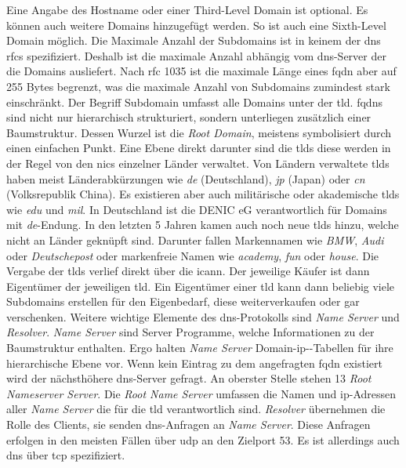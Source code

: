 \documentclass[titlepage]{report}
\begin{document}
Eine Angabe des Hostname oder einer Third-Level
Domain ist optional. Es können auch weitere Domains hinzugefügt werden.
So ist auch eine Sixth-Level Domain möglich. Die Maximale Anzahl der
Subdomains ist in keinem der \gls{dns} \glspl{rfc} spezifiziert. Deshalb
ist die maximale Anzahl abhängig vom \gls{dns}\hyp{}Server der die
Domains ausliefert. Nach \gls{rfc} 1035 ist die maximale Länge eines
\gls{fqdn} aber auf 255 Bytes begrenzt\cite[siehe Section
2.3.4]{RFC1035}, was die maximale Anzahl von Subdomains zumindest stark
einschränkt. Der Begriff Subdomain umfasst alle Domains unter der
\gls{tld}. \glspl{fqdn} sind nicht nur hierarchisch strukturiert, sondern
unterliegen zusätzlich einer Baumstruktur. Dessen Wurzel ist die
\emph{Root Domain}, meistens symbolisiert durch einen einfachen Punkt.
Eine Ebene direkt darunter sind die \glspl{tld} diese
werden in der Regel von den \glspl{nic} einzelner Länder verwaltet. Von
Ländern verwaltete \glspl{tld} haben meist Länderabkürzungen wie
\emph{de} (Deutschland), \emph{jp} (Japan) oder \emph{cn} (Volksrepublik
China). Es existieren aber auch militärische oder akademische
\glspl{tld} wie \emph{edu} und \emph{mil}. In Deutschland ist die DENIC eG
verantwortlich für Domains mit \emph{de}\hyp{}Endung.
In den letzten 5 Jahren kamen auch noch neue \glspl{tld} hinzu, welche
nicht an Länder geknüpft sind. Darunter fallen Markennamen wie
\emph{BMW}, \emph{Audi} oder \emph{Deutschepost} oder markenfreie Namen
wie \emph{academy}, \emph{fun} oder \emph{house}\cite{NEWTLDLIST}. Die
Vergabe der \glspl{tld} verlief direkt über die \gls{icann}. Der jeweilige
Käufer ist dann Eigentümer der jeweiligen \gls{tld}. Ein Eigentümer
einer \gls{tld} kann dann beliebig viele Subdomains erstellen für den
Eigenbedarf, diese weiterverkaufen oder gar verschenken. Weitere
wichtige Elemente des \gls{dns}\hyp{}Protokolls sind \emph{Name Server}
und \emph{Resolver}\cite[Siehe Section 2.4]{RFC1034}.
\emph{Name Server} sind Server Programme, welche
Informationen zu der Baumstruktur enthalten. Ergo halten \emph{Name
Server} Domain\hyp{}\gls{ip}\hyp{}\hyp{}Tabellen für ihre
hierarchische Ebene vor. Wenn kein Eintrag zu dem angefragten \gls{fqdn}
existiert wird der nächsthöhere \gls{dns}\hyp{}Server gefragt. An
oberster Stelle stehen 13 \emph{Root Nameserver
Server}\cite{ROOTNAMESERVER}. Die \emph{Root
Name Server} umfassen die Namen und \gls{ip}\hyp{}Adressen aller
\emph{Name Server} die für die \gls{tld} verantwortlich sind.
\emph{Resolver} übernehmen die Rolle des Clients, sie senden
\gls{dns}\hyp{}Anfragen an \emph{Name Server}. Diese
Anfragen erfolgen in den meisten Fällen über \gls{udp} an den Zielport
53\cite[Siehe Section 4.2.1]{RFC1035}. Es ist allerdings auch \gls{dns}
über \gls{tcp} spezifiziert\cite[Siehe Section 4.2.2]{RFC1035}.
\end{document}
